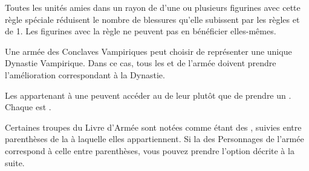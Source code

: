 \armyspecialruleentry{\necromanticaura}

Toutes les unités amies dans un rayon de  d'une ou plusieurs figurines avec cette règle spéciale réduisent le nombre de blessures qu'elle subissent par les règles \ashestoashes{} et \unstable{} de 1. Les figurines avec la règle \necromanticaura{} ne peuvent pas en bénéficier elles-mêmes.


\closearmyspecialrules



\spaceaftersection{}

Une armée des Conclaves Vampiriques peut choisir de représenter une unique Dynastie Vampirique. Dans ce cas, tous les \vampirelords{} et \vampireheroes{} de l'armée doivent prendre l'amélioration correspondant à la Dynastie.


Les \vampirelords{} appartenant à une \bloodline{} peuvent accéder au \ancientbloodpower{} de leur \bloodline{} plutôt que de prendre un \bloodpower{}. Chaque \ancientbloodpower{} est \oneofakind{}.


Certaines troupes du Livre d'Armée sont notées comme étant des \bloodties{}, suivies entre parenthèses de la \bloodline{} à laquelle elles appartiennent. Si la \bloodline{} des Personnages \vampires{} de l'armée correspond à celle entre parenthèses, vous pouvez prendre l'option décrite à la suite.


